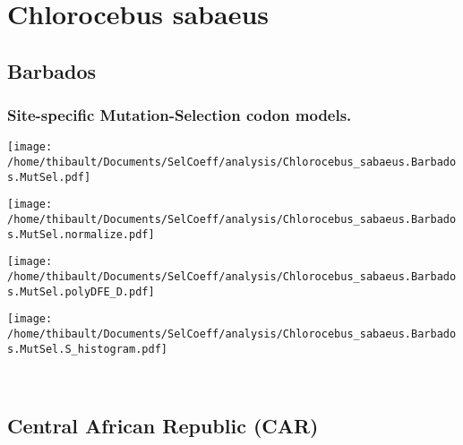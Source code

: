 \section{Chlorocebus sabaeus} 
 
\subsection{Barbados} 
 
\subsubsection*{Site-specific Mutation-Selection codon models.} 
\begin{minipage}{0.49\linewidth} 
\texttt{[image: /home/thibault/Documents/SelCoeff/analysis/Chlorocebus\_sabaeus.Barbados.MutSel.pdf]} 
\end{minipage}
\begin{minipage}{0.49\linewidth} 
\texttt{[image: /home/thibault/Documents/SelCoeff/analysis/Chlorocebus\_sabaeus.Barbados.MutSel.normalize.pdf]} 
\end{minipage}
\begin{minipage}{0.49\linewidth} 
\texttt{[image: /home/thibault/Documents/SelCoeff/analysis/Chlorocebus\_sabaeus.Barbados.MutSel.polyDFE\_D.pdf]} 
\end{minipage}
\begin{minipage}{0.49\linewidth} 
\texttt{[image: /home/thibault/Documents/SelCoeff/analysis/Chlorocebus\_sabaeus.Barbados.MutSel.S\_histogram.pdf]} 
\end{minipage}
\\ 
\subsection{Central African Republic (CAR)} 
 
